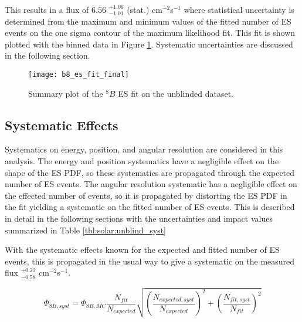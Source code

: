 This results in a flux of $6.56$ $^{+1.06}_{-1.01}$ (stat.) cm$^{-2}$s$^{-1}$
where statistical uncertainty is determined from the maximum and minimum values
of the fitted number of ES events on the one sigma contour of the maximum 
likelihood fit.
This fit is shown plotted with the binned data in Figure 
\ref{fig:solar:unblind_fit}.
Systematic uncertainties are discussed in the following section.

\begin{figure}
\centering
\texttt{[image: b8\_es\_fit\_final]}
\caption{Summary plot of the $^8B$ ES fit on the unblinded dataset.}
\label{fig:solar:unblind_fit}
\end{figure}


\subsection{Systematic Effects}

Systematics on energy, position, and angular resolution are considered in this 
analysis. 
The energy and position systematics have a negligible effect on the shape of 
the ES PDF, so these systematics are propagated through the expected number of 
ES events. 
The angular resolution systematic has a negligible effect on the effected 
number of events, so it is propagated by distorting the ES PDF in the 
fit yielding a systematic on the fitted number of ES events.
This is described in detail in the following sections with the uncertainties 
and  impact values summarized in Table \ref{tbl:solar:unblind_syst}

With the systematic effects known for the expected and fitted number of ES
events, this is propagated in the usual way to give a systematic on the 
measured flux $^{+0.23}_{-0.58}$ cm$^{-2}$s$^{-1}$.

\begin{equation}
\Phi_{8B,syst} = \Phi_{8B,MC}\frac{N_{fit}}{N_{expected}} \sqrt{
    \left(\frac{N_{expected,syst}}{N_{expected}}\right)^2 +
    \left(\frac{N_{fit,syst}}{N_{fit}}\right)^2
    }
\end{equation}

